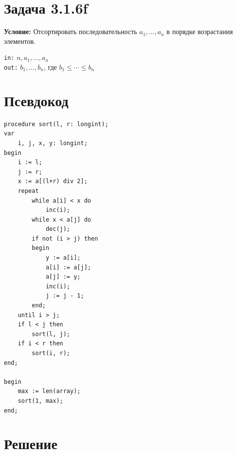 \documentclass[12pt]{article}
\begin{document}
\section*{Задача 3.1.6f}

\textbf{Условие:} Отсортировать последовательность $a_1,\ldots,a_n$ в порядке возрастания элементов.

\texttt{in:} $n,a_1,\ldots,a_n$\\
\texttt{out:} $b_1,\ldots,b_n$, где $b_1\leq\cdots\leq b_n$

\section*{Псевдокод}
\begin{verbatim}
procedure sort(l, r: longint);
var
    i, j, x, y: longint;
begin
    i := l;
    j := r;
    x := a[(l+r) div 2];
    repeat
        while a[i] < x do
            inc(i);
        while x < a[j] do
            dec(j);
        if not (i > j) then
        begin
            y := a[i];
            a[i] := a[j];
            a[j] := y;
            inc(i);
            j := j - 1;
        end;
    until i > j;
    if l < j then
        sort(l, j);
    if i < r then
        sort(i, r);
end;

begin
    max := len(array);
    sort(1, max);
end;
\end{verbatim}

\section*{Решение}
\end{document}

